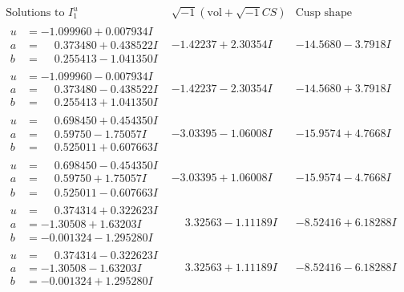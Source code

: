 \documentclass[1p]{elsarticle_modified}
\theoremstyle{definition}
\newcommand{\I}{\sqrt{-1}}
\begin{document}
$$\begin{array}{c|c|c}  
\text{Solutions to }I^u_{1}& \I (\text{vol} + \sqrt{-1}CS) & \text{Cusp shape}\\
 \hline 
\begin{aligned}
u &= -1.099960 + 0.007934 I \\
a &= \phantom{-}0.373480 + 0.438522 I \\
b &= \phantom{-}0.255413 - 1.041350 I\end{aligned}
 & -1.42237 + 2.30354 I & -14.5680 - 3.7918 I \\ \hline\begin{aligned}
u &= -1.099960 - 0.007934 I \\
a &= \phantom{-}0.373480 - 0.438522 I \\
b &= \phantom{-}0.255413 + 1.041350 I\end{aligned}
 & -1.42237 - 2.30354 I & -14.5680 + 3.7918 I \\ \hline\begin{aligned}
u &= \phantom{-}0.698450 + 0.454350 I \\
a &= \phantom{-}0.59750 - 1.75057 I \\
b &= \phantom{-}0.525011 + 0.607663 I\end{aligned}
 & -3.03395 - 1.06008 I & -15.9574 + 4.7668 I \\ \hline\begin{aligned}
u &= \phantom{-}0.698450 - 0.454350 I \\
a &= \phantom{-}0.59750 + 1.75057 I \\
b &= \phantom{-}0.525011 - 0.607663 I\end{aligned}
 & -3.03395 + 1.06008 I & -15.9574 - 4.7668 I \\ \hline\begin{aligned}
u &= \phantom{-}0.374314 + 0.322623 I \\
a &= -1.30508 + 1.63203 I \\
b &= -0.001324 - 1.295280 I\end{aligned}
 & \phantom{-}3.32563 - 1.11189 I & -8.52416 + 6.18288 I \\ \hline\begin{aligned}
u &= \phantom{-}0.374314 - 0.322623 I \\
a &= -1.30508 - 1.63203 I \\
b &= -0.001324 + 1.295280 I\end{aligned}
 & \phantom{-}3.32563 + 1.11189 I & -8.52416 - 6.18288 I \\ \hline\begin{aligned}

\end{aligned}
\end{array}$$
\end{document}
